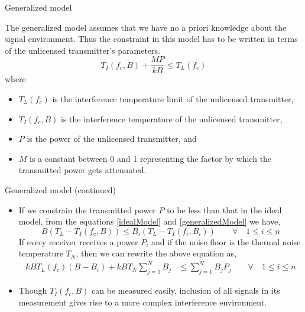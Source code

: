 \documentclass[mathserif]{beamer}
\begin{document}
\begin{frame}{Generalized model}

The generalized model assumes that we have no a priori knowledge about the signal environment. Thus the constraint in this model has to be written in terms of the unlicensed transmitter's parameters.
\begin{equation}
    T_I(f_c,B) + \frac{MP}{kB} \leq T_L(f_c) \label{generalizedModel}
\end{equation}
where
\pause
\begin{itemize}
	\item $T_L(f_c)$ is the interference temperature limit of the unlicensed transmitter,
	\item $T_I(f_c,B)$ is the interference temperature of the unlicensed transmitter, 
	\item $P$ is the power of the unlicensed transmitter, and
	\item $M$ is a constant between 0 and 1 representing the factor by which the transmitted power gets attenuated.
\end{itemize}

\end{frame}





\begin{frame}{Generalized model (continued)}

\begin{itemize}
\item If we constrain the transmitted power $P$ to be less than that in the ideal model, from the equations \eqref{idealModel} and \eqref{generalizedModel} we have,
\begin{equation*}
    B(T_L - T_I(f_c,B)) \leq  B_i(T_L - T_I(f_i,B_i)) \qquad \forall \quad 1 \leq i \leq n \label{powerCompare}
\end{equation*}
If every receiver receives a power $P_i$ and if the noise floor is the thermal noise temperature $T_N$, then we can rewrite the above equation as,
\begin{align*}
    kBT_L(f_c)(B-B_i) + kBT_N\sum_{j=1}^{N}B_j & \leq \sum_{j=1}^{N}B_jP_j \qquad \forall \quad 1 \leq i\leq n
\end{align*}

\pause
\item
Though $T_I(f_c,B)$ can be measured easily, inclusion of all signals in its measurement gives rise to a more complex interference environment.

\end{itemize}

\end{frame}
\end{document}
